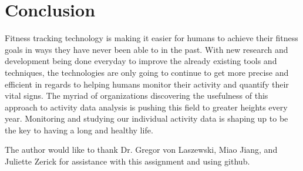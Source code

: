 \documentclass[sigconf]{acmart}
\begin{document}
\section{Conclusion}

Fitness tracking technology is making it easier for humans to achieve their fitness goals in ways they have never been able to in the past. With new research and development being done everyday to improve the already existing tools and techniques, the technologies are only going to continue to get more precise and efficient in regards to helping humans monitor their activity and quantify their vital signs. The myriad of organizations discovering the usefulness of this approach to activity data analysis is pushing this field to greater heights every year. Monitoring and studying our individual activity data is shaping up to be the key to having a long and healthy life.

\begin{acks}

  The author would like to thank Dr. Gregor von Laszewski, Miao Jiang, and Juliette Zerick for assistance with this assignment and using github.

\end{acks}



 




\end{document}
